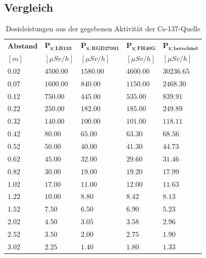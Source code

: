 \documentclass[12pt,german]{article}
\begin{document}
    \subsection{Vergleich}
    \begin{table}[H]
        \centering
        \begin{tabularx}{1\textwidth}{X|X|X|X|X}
            \toprule
            \( \mathbf{Abstand} \) & \( \mathbf{P_{x; LB 133}} \) & \( \mathbf{P_{x; RGD 27091}} \) & \( \mathbf{P_{x; FH40G}} \) & \( \mathbf{P_{x; berechnet}} \) \\
            $[m]$ & $[\mu Sv/h]$ & $[\mu Sv/h]$ & $[\mu Sv/h]$ & $[\mu Sv/h]$ \\
            \midrule
            $   0.02 $ & $ 4500.00 $ & $ 1580.00 $ & $ 4600.00 $ & $ 30236.65 $ \\
            $   0.07 $ & $ 1600.00 $ & $ 840.00 $ & $ 1150.00 $ & $ 2468.30 $ \\
            $   0.12 $ & $ 750.00 $ & $ 445.00 $ & $ 535.00 $ & $ 839.91 $ \\
            $   0.22 $ & $ 250.00 $ & $ 182.00 $ & $ 185.00 $ & $ 249.89 $ \\
            $   0.32 $ & $ 140.00 $ & $ 100.00 $ & $ 101.00 $ & $ 118.11 $ \\
            $   0.42 $ & $  80.00 $ & $  65.00 $ & $  63.30 $ & $  68.56 $ \\
            $   0.52 $ & $  50.00 $ & $  40.00 $ & $  41.30 $ & $  44.73 $ \\
            $   0.62 $ & $  45.00 $ & $  32.00 $ & $  29.60 $ & $  31.46 $ \\
            $   0.82 $ & $  30.00 $ & $  19.00 $ & $  19.20 $ & $  17.99 $ \\
            $   1.02 $ & $  17.00 $ & $  11.00 $ & $  12.00 $ & $  11.63 $ \\
            $   1.22 $ & $  10.00 $ & $   8.80 $ & $   8.42 $ & $   8.13 $ \\
            $   1.52 $ & $   7.50 $ & $   6.50 $ & $   6.90 $ & $   5.23 $ \\
            $   2.02 $ & $   4.50 $ & $   3.05 $ & $   3.58 $ & $   2.96 $ \\
            $   2.52 $ & $   3.50 $ & $   2.00 $ & $   2.75 $ & $   1.90 $ \\
            $   3.02 $ & $   2.25 $ & $   1.40 $ & $   1.80 $ & $   1.33 $ \\
            \bottomrule
        \end{tabularx}
        \caption{Dosisleistungen aus der gegebenen Aktivität der Cs-137-Quelle}
    \end{table}
    
\end{document}
